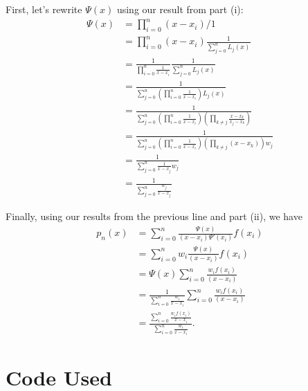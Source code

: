 \documentclass[a4paper,12pt]{article}
\begin{document}
\begin{enumerate}[label = \arabic*)]
\begin{enumerate}[label = (\roman*)]
			First, let's rewrite $ \Psi(x) $ using our result from part (i):
			\begin{align*}
				\Psi(x) &= \prod_{i = 0}^{n} (x - x_i) / 1 \\
				&= \prod_{i = 0}^{n} (x - x_i) \frac{1}{\sum_{j = 0}^{n} L_j(x)} \\
				&= \frac{1}{\prod_{i = 0}^{n} \frac{1}{x - x_i}} \frac{1}{\sum_{j = 0}^{n} L_j(x)} \\
				&= \frac{1}{\sum_{j = 0}^n \left(\prod_{i = 0}^{n} \frac{1}{x - x_i}\right)L_j(x)} \\
				&= \frac{1}{\sum_{j = 0}^n\left(\prod_{i = 0}^{n} \frac{1}{x - x_i}\right) \left(\prod_{k \neq j}\frac{x - x_k}{x_j - x_k}\right)} \\
				&= \frac{1}{\sum_{j = 0}^n\left(\prod_{i = 0}^{n} \frac{1}{x - x_i}\right) \left(\prod_{k \neq j}(x - x_k)\right) w_j} \\
				&= \frac{1}{\sum_{j = 0}^n \frac{1}{x - x_j} w_j} \\
				&= \frac{1}{\sum_{j = 0}^n \frac{w_j}{x - x_j}}
			\end{align*}
			
			
			Finally, using our results from the previous line and part (ii), we have
			\begin{align*}
				p_n(x) &= \sum_{i = 0}^n \frac{\Psi(x)}{(x - x_i) \Psi'(x_i)} f(x_i) \\
				&= \sum_{i = 0}^n w_i \frac{\Psi(x)}{(x - x_i)} f(x_i) \\
				&= \Psi(x) \sum_{i = 0}^n \frac{w_i f(x_i)}{(x - x_i)} \\
				&= \frac{1}{\sum_{i = 0}^n \frac{w_i}{x - x_i}} \sum_{i = 0}^n \frac{w_i f(x_i)}{(x - x_i)} \\
				&= \frac{\sum_{i = 0}^{n} \frac{w_i f(x_i)}{x - x_i}}{\sum_{i = 0}^{n} \frac{w_i}{x - x_i}}.
			\end{align*}
		\end{enumerate}
	\end{enumerate}

\section*{Code Used}
	
\end{document}
